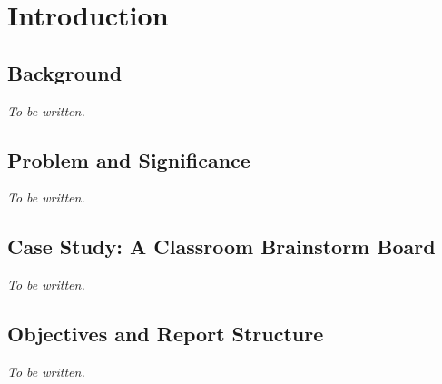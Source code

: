 
\section{Introduction}\label{sec:intro}

\subsection{Background}

\textit{To be written.}

\subsection{Problem and Significance}

\textit{To be written.}

\subsection{Case Study: A Classroom Brainstorm Board}

\textit{To be written.}

\subsection{Objectives and Report Structure}

\textit{To be written.}

